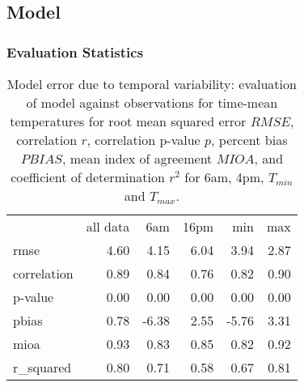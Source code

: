\documentclass[draft,linenumbers]{agujournal}
\begin{document}
\subsection{Model}
\label{sec:results_model}

\subsubsection{Evaluation Statistics}

\begin{table}
\centering
\begin{tabular}{lrrrrr}
{} &  all data &     6am &   16pm &   min &  max \\
rmse        &      4.60 &  4.15 & 6.04 &  3.94 & 2.87 \\
correlation &      0.89 &  0.84 & 0.76 &  0.82 & 0.90 \\
p-value     &      0.00 &  0.00 & 0.00 &  0.00 & 0.00 \\
pbias       &      0.78 & -6.38 & 2.55 & -5.76 & 3.31 \\
mioa        &      0.93 &  0.83 & 0.85 &  0.82 & 0.92 \\
r\_squared   &      0.80 &  0.71 & 0.58 &  0.67 & 0.81 \\
\end{tabular}
\caption{Model error due to temporal variability: evaluation of model against observations for time-mean temperatures for root mean squared error $RMSE$, correlation  $r$, correlation p-value $p$, percent bias $PBIAS$, mean index of agreement $MIOA$, and coefficient of determination $r^2$ for 6am, 4pm, $T_{min}$ and $T_{max}$.  }
\label{tab:time_error}
\end{table}
\end{document}
